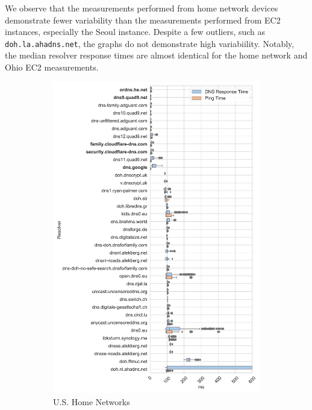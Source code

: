 We observe that the measurements performed from home network devices 
demonstrate fewer variability than the measurements performed from EC2 instances, 
especially the Seoul instance. Despite a few outliers, such as \texttt{doh.la.ahadns.net}, 
the graphs do not demonstrate high variabiility. Notably, the median resolver response 
times are almost identical for the home network and Ohio EC2 measurements. 

\begin{figure}[t!]
\centering
%
\begin{subfigure}[b]{0.4\textwidth}
\includegraphics[width=\textwidth]{figures/poah_europe.png}
\caption{U.S. Home Networks}
\label{fig:subfiga}
\end{subfigure}
%
\begin{subfigure}[b]{0.4\textwidth}

\end{subfigure}
\end{figure}
